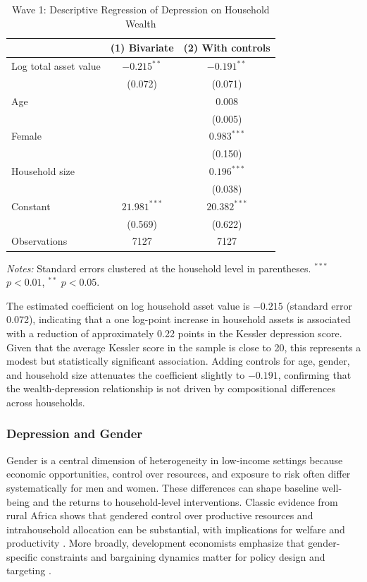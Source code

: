 \documentclass[12pt]{article}
\begin{document}
\begin{table}[H]
\centering
\caption{Wave 1: Descriptive Regression of Depression on Household Wealth}
\label{tab:wealth_reg}
\begin{tabular}{lcc}
\toprule
 & (1) Bivariate & (2) With controls \\
\midrule
Log total asset value & $-0.215^{**}$ & $-0.191^{**}$ \\
 & (0.072) & (0.071) \\[4pt]
Age & & $0.008$ \\
 & & (0.005) \\[4pt]
Female & & $0.983^{***}$ \\
 & & (0.150) \\[4pt]
Household size & & $0.196^{***}$ \\
 & & (0.038) \\[4pt]
Constant & $21.981^{***}$ & $20.382^{***}$ \\
 & (0.569) & (0.622) \\
\midrule
Observations & 7127 & 7127 \\
\bottomrule
\end{tabular}
\begin{flushleft}
\small\textit{Notes:} Standard errors clustered at the household level in parentheses. $^{***}$ $p<0.01$, $^{**}$ $p<0.05$.
\end{flushleft}
\end{table}

The estimated coefficient on log household asset value is $-0.215$ (standard error 0.072), indicating that a one log-point increase in household assets is associated with a reduction of approximately 0.22 points in the Kessler depression score. Given that the average Kessler score in the sample is close to 20, this represents a modest but statistically significant association. Adding controls for age, gender, and household size attenuates the coefficient slightly to $-0.191$, confirming that the wealth-depression relationship is not driven by compositional differences across households.


\subsubsection{Depression and Gender}

Gender is a central dimension of heterogeneity in low-income settings because economic opportunities, control over resources, and exposure to risk often differ systematically for men and women. These differences can shape baseline well-being and the returns to household-level interventions. Classic evidence from rural Africa shows that gendered control over productive resources and intrahousehold allocation can be substantial, with implications for welfare and productivity \citep{Udry1996}. More broadly, development economists emphasize that gender-specific constraints and bargaining dynamics matter for policy design and targeting \citep{Duflo2012}.
\end{document}
